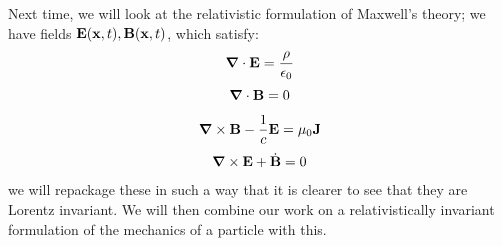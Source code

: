 Next time, we will look at the relativistic formulation of Maxwell's theory; we have fields $\mathbf{E}(\mathbf{x}, t), \mathbf{B}(\mathbf{x}, t)$, which satisfy:
\begin{equation}
    \nabla \cdot \v{E} = \frac{\rho}{\e_0}
\end{equation}
\begin{equation}
    \nabla \cdot \v{B} = 0
\end{equation}
\begin{equation}
    \nabla \times \v{B} - \frac{1}{c}\v{E} = \mu_0 \v{J}
\end{equation}
\begin{equation}
    \nabla \times \v{E} + \dot{\v{B}} = 0
\end{equation}
we will repackage these in such a way that it is clearer to see that they are Lorentz invariant. We will then combine our work on a relativistically invariant formulation of the mechanics of a particle with this.